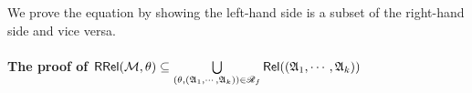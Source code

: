 We prove the equation by showing the left-hand side is a subset of the right-hand side and vice versa. 

\paragraph*{The proof of $\mathsf{RRel}({\mathcal{M} }, \theta) \subseteq \bigcup \limits_{(\theta, ({\mathfrak{A} }_1, \cdots, {\mathfrak{A} }_k)) \in \mathscr{R}_f} \mathsf{Rel}(({\mathfrak{A} }_1, \cdots, {\mathfrak{A} }_k))$}



